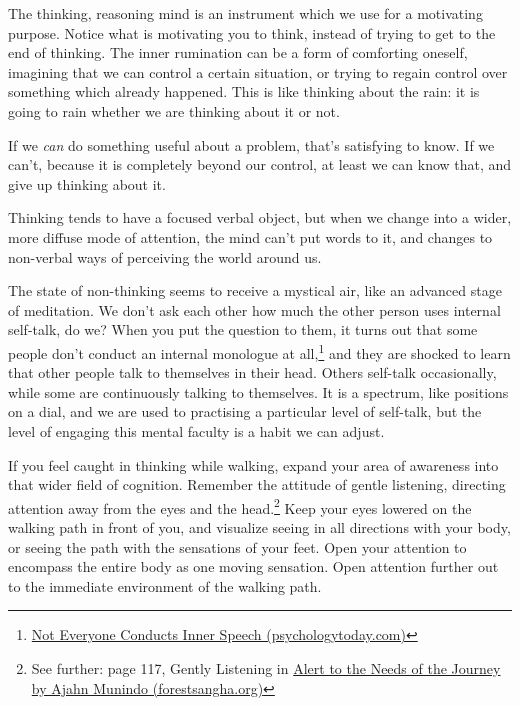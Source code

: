 The thinking, reasoning mind is an instrument which we use for a
motivating purpose. Notice what is motivating you to think, instead of
trying to get to the end of thinking. The inner rumination can be a form
of comforting oneself, imagining that we can control a certain
situation, or trying to regain control over something which already
happened. This is like thinking about the rain: it is going to rain
whether we are thinking about it or not.

If we \emph{can} do something useful about a problem, that's satisfying
to know. If we can't, because it is completely beyond our control, at
least we can know that, and give up thinking about it.

Thinking tends to have a focused verbal object, but when we change into
a wider, more diffuse mode of attention, the mind can't put words to it,
and changes to non-verbal ways of perceiving the world around us.

The state of non-thinking seems to receive a mystical air, like an
advanced stage of meditation. We don't ask each other how much the other
person uses internal self-talk, do we? When you put the question to
them, it turns out that some people don't conduct an internal monologue
at all,\footnote{\href{https://www.psychologytoday.com/us/blog/pristine-inner-experience/201110/not-everyone-conducts-inner-speech}{Not
  Everyone Conducts Inner Speech (psychologytoday.com)}} and they are
shocked to learn that other people talk to themselves in their head.
Others self-talk occasionally, while some are continuously talking to
themselves. It is a spectrum, like positions on a dial, and we are used
to practising a particular level of self-talk, but the level of engaging
this mental faculty is a habit we can adjust.

If you feel caught in thinking while walking, expand your area of
awareness into that wider field of cognition. Remember the attitude of
gentle listening, directing attention away from the eyes and the
head.\footnote{See further: page 117, Gently Listening in
  \href{https://forestsangha.org/teachings/books/alert-to-the-needs-of-the-journey?language=English}{Alert
  to the Needs of the Journey by Ajahn Munindo (forestsangha.org)}} Keep
your eyes lowered on the walking path in front of you, and visualize
seeing in all directions with your body, or seeing the path with the
sensations of your feet. Open your attention to encompass the entire
body as one moving sensation. Open attention further out to the
immediate environment of the walking path.

